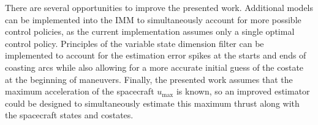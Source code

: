 \documentclass[letterpaper, preprint, paper,11pt]{AAS}	%
\begin{document}
There are several opportunities to improve the presented work. Additional models can be implemented into the IMM to simultaneously account for more possible control policies, as the current implementation assumes only a single optimal control policy. Principles of the variable state dimension filter can be implemented to account for the estimation error spikes at the starts and ends of coasting arcs while also allowing for a more accurate initial guess of the costate at the beginning of maneuvers. Finally, the presented work assumes that the maximum acceleration of the spacecraft $u_\text{max}$ is known, so an improved estimator could be designed to simultaneously estimate this maximum thrust along with the spacecraft states and costates. 

\end{document}
